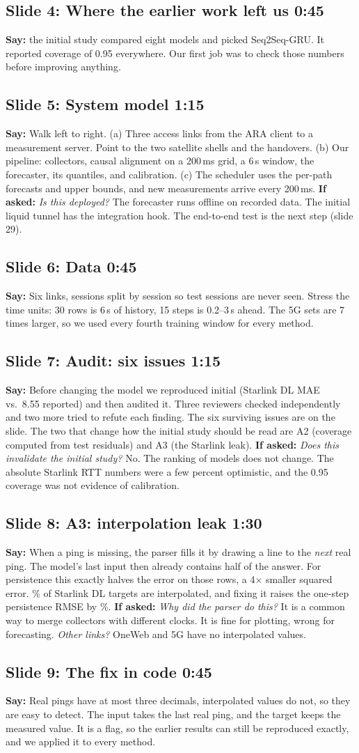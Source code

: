 \documentclass[11pt]{article}
\newcommand{\slide}[3]{\subsection*{Slide #1: #2 \hfill{\normalsize\color{gray}#3}}}
\newcommand{\say}{\textbf{Say:} }
\newcommand{\watch}{\textbf{If asked:} }
\begin{document}
\slide{4}{Where the earlier work left us}{0:45}
\say the initial study compared eight models and picked Seq2Seq-GRU. It reported coverage of 0.95 everywhere. Our first job was to check those numbers before improving anything.

\slide{5}{System model}{1:15}
\say Walk left to right. (a) Three access links from the ARA client to a measurement server. Point to the two satellite shells and the handovers. (b) Our pipeline: collectors, causal alignment on a 200\,ms grid, a 6\,s window, the forecaster, its quantiles, and calibration. (c) The scheduler uses the per-path forecasts and upper bounds, and new measurements arrive every 200\,ms.
\watch \emph{Is this deployed?} The forecaster runs offline on recorded data. The initial liquid tunnel has the integration hook. The end-to-end test is the next step (slide 29).

\slide{6}{Data}{0:45}
\say Six links, sessions split by session so test sessions are never seen. Stress the time units: 30 rows is 6\,s of history, 15 steps is 0.2--3\,s ahead. The 5G sets are 7 times larger, so we used every fourth training window for every method.

\slide{7}{Audit: six issues}{1:15}
\say Before changing the model we reproduced initial (Starlink DL MAE \ReproSLMAE{} vs.\ 8.55 reported) and then audited it. Three reviewers checked independently and two more tried to refute each finding. The six surviving issues are on the slide. The two that change how the initial study should be read are A2 (coverage computed from test residuals) and A3 (the Starlink leak).
\watch \emph{Does this invalidate the initial study?} No. The ranking of models does not change. The absolute Starlink RTT numbers were a few percent optimistic, and the 0.95 coverage was not evidence of calibration.

\slide{8}{A3: interpolation leak}{1:30}
\say When a ping is missing, the parser fills it by drawing a line to the \emph{next} real ping. The model's last input then already contains half of the answer. For persistence this exactly halves the error on those rows, a 4$\times$ smaller squared error. \InterpFracSLDL\% of Starlink DL targets are interpolated, and fixing it raises the one-step persistence RMSE by \AuditPersHonePct\%.
\watch \emph{Why did the parser do this?} It is a common way to merge collectors with different clocks. It is fine for plotting, wrong for forecasting. \emph{Other links?} OneWeb and 5G have no interpolated values.

\slide{9}{The fix in code}{0:45}
\say Real pings have at most three decimals, interpolated values do not, so they are easy to detect. The input takes the last real ping, and the target keeps the measured value. It is a flag, so the earlier results can still be reproduced exactly, and we applied it to every method.
\end{document}
